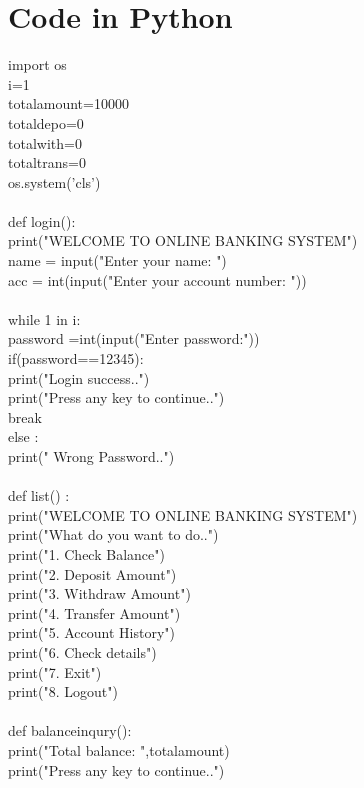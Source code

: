 \documentclass[12pt,a4 paper]{article}
\begin{document}
\section{Code in Python}
import os\\
i=1\\
totalamount=10000\\
totaldepo=0\\
totalwith=0\\
totaltrans=0\\
os.system('cls')\\
\\
def login():\\
 print("WELCOME TO ONLINE BANKING SYSTEM")\\
 name = input("Enter your name: ")\\
 acc = int(input("Enter your account number: "))\\
\\
 while 1 in i:\\
    password =int(input("Enter password:"))\\
    if(password==12345):\\
      print("Login success..")\\
      print("Press any key to continue..")\\
      break\\
    else :\\
      print(" Wrong Password..")\\
\\

def list() :\\      
  print("WELCOME TO ONLINE BANKING SYSTEM")\\
  print("What do you want to do..")\\
  print("1. Check Balance")\\
  print("2. Deposit Amount")\\
  print("3. Withdraw Amount")\\
  print("4. Transfer Amount")\\
  print("5. Account History")\\
  print("6. Check details")\\
  print("7. Exit")\\
  print("8. Logout")\\
  \\

def balanceinqury():\\
	print("Total balance: ",totalamount)\\
	print("Press any key to continue..")\\
  \\
\end{document}
